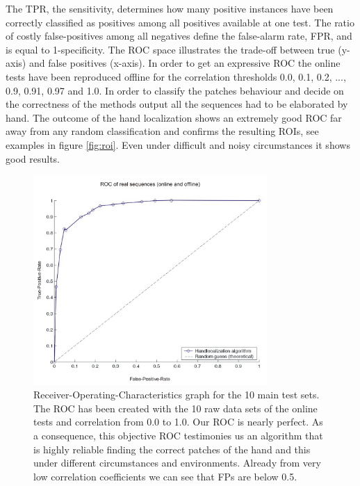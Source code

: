 The TPR, the sensitivity, determines how many positive instances have been correctly classified as positives among all positives available at one test. The ratio of costly false-positives among all negatives define the false-alarm rate, FPR, and is equal to 1-specificity. %
The ROC space illustrates the trade-off between true (y-axis) and false positives (x-axis). In order to get an expressive ROC the online tests have been reproduced offline for the correlation thresholds 0.0, 0.1, 0.2, ..., 0.9, 0.91, 0.97 and 1.0. In order to classify the patches behaviour and decide on the correctness of the methods output all the sequences had to be elaborated by hand. The outcome of the hand localization shows an extremely good ROC far away from any random classification and confirms the resulting ROIs, see examples in figure \ref{fig:roi}. Even under difficult and noisy circumstances it shows good results.
%
\begin{figure}
	\begin{center}
		\includegraphics[width=3.5in]{imgs/results/roc.pdf}
			\caption[Receiver-Operating-Characteristics graph for the 10 main test sets. ]{Receiver-Operating-Characteristics graph for the 10 main test sets. The ROC has been created with the 10 raw data sets of the online tests and correlation from 0.0 to 1.0. Our ROC is nearly perfect. As a consequence, this objective ROC testimonies us an algorithm that is highly reliable finding the correct patches of the hand and this under different circumstances and environments. Already from very low correlation coefficients we can see that FPs are below 0.5. }
			\label{fig:result:roc}
	\end{center}
\end{figure}
%
%
